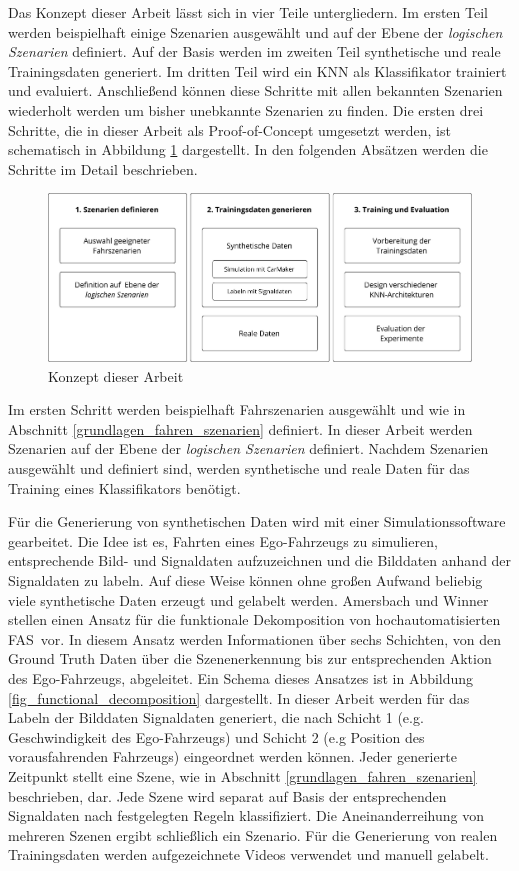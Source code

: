 Das Konzept dieser Arbeit lässt sich in vier Teile untergliedern. Im ersten Teil werden beispielhaft einige Szenarien ausgewählt und auf der Ebene der \textit{logischen Szenarien} definiert. Auf der Basis werden im zweiten Teil synthetische und reale Trainingsdaten generiert. Im dritten Teil wird ein \ac{KNN} als Klassifikator trainiert und evaluiert. Anschließend können diese Schritte mit allen bekannten Szenarien wiederholt werden um bisher unebkannte Szenarien zu finden. Die ersten drei Schritte, die in dieser Arbeit als Proof-of-Concept umgesetzt werden, ist schematisch in Abbildung \ref{fig_konzept_struktur} dargestellt. In den folgenden Absätzen werden die Schritte im Detail beschrieben.

\begin{figure}[h]
\centering
\includegraphics[scale=0.6]{images/konzept_struktur.pdf}
\caption{Konzept dieser Arbeit}
\label{fig_konzept_struktur}
\end{figure}

Im ersten Schritt werden beispielhaft Fahrszenarien ausgewählt und wie in Abschnitt \ref{grundlagen_fahren_szenarien} definiert. In dieser Arbeit werden Szenarien auf der Ebene der \textit{logischen Szenarien} definiert. Nachdem Szenarien ausgewählt und definiert sind, werden synthetische und reale Daten für das Training eines Klassifikators benötigt.

Für die Generierung von synthetischen Daten wird mit einer Simulationssoftware gearbeitet. Die Idee ist es, Fahrten eines Ego-Fahrzeugs zu simulieren, entsprechende Bild- und Signaldaten aufzuzeichnen und die Bilddaten anhand der Signaldaten zu labeln. Auf diese Weise können ohne großen Aufwand beliebig viele synthetische Daten erzeugt und gelabelt werden. Amersbach und Winner \cite{amersbach2017functional} stellen einen Ansatz für die funktionale Dekomposition von hochautomatisierten \ac{FAS} vor. In diesem Ansatz werden Informationen über sechs Schichten, von den Ground Truth Daten über die Szenenerkennung bis zur entsprechenden Aktion des Ego-Fahrzeugs, abgeleitet. Ein Schema dieses Ansatzes ist in Abbildung \ref{fig_functional_decomposition} dargestellt. In dieser Arbeit werden für das Labeln der Bilddaten Signaldaten generiert, die nach Schicht 1 (e.g. Geschwindigkeit des Ego-Fahrzeugs) und Schicht 2 (e.g Position des vorausfahrenden Fahrzeugs) eingeordnet werden können. Jeder generierte Zeitpunkt stellt eine Szene, wie in Abschnitt \ref{grundlagen_fahren_szenarien} beschrieben, dar. Jede Szene wird separat auf Basis der entsprechenden Signaldaten nach festgelegten Regeln klassifiziert. Die Aneinanderreihung von mehreren Szenen ergibt schließlich ein Szenario. Für die Generierung von realen Trainingsdaten werden aufgezeichnete Videos verwendet und manuell gelabelt.


